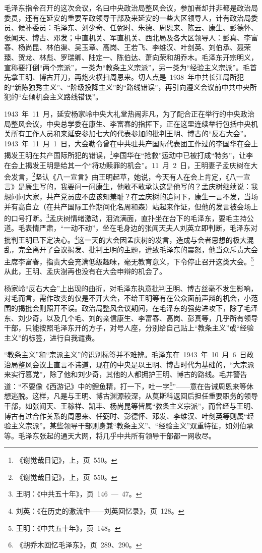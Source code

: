 毛泽东指令召开的这次会议，名曰中央政治局整风会议，参加者却并非都是政治局委员，还有在延安的重要军政领导干部及来延安的一些大区领导人，计有政治局委员、候补委员：毛泽东、刘少奇、任弼时、朱德、周恩来、陈云、康生、彭德怀、张闻天、博古、邓发；中直机关、军直机关、西北局及各大区领导人：彭真、李富春、杨尚昆、林伯渠、吴玉章、高岗、王若飞、李维汉、叶剑英、刘伯承、聂荣臻、贺龙、林彪、罗瑞卿、陆定一、陈伯达、萧向荣和胡乔木。毛泽东开宗明义，宣称要打倒“两个宗派”，一类为“教条主义宗派”，另一类为“经验主义宗派”。毛首先拿王明、博古开刀，再炮火横扫周恩来。切人点是~1938~年中共长江局所犯的“新陈独秀主义”、“阶级投降主义”的“路线错误”，再引向遵义会议前中共中央所犯的“左倾机会主义路线错误”。

1943~年~11~月，延安杨家岭中央大礼堂热闹非凡，为了配合正在举行的中央政治局整风会议，中央总学委在康生、李富春的指挥下，正在这里连续举行包括中央机关所有工作人员和来延安参加七大的代表参加的批判王明、博古的“反右大会”。1943~年~11~月~1~日，大会勒令曾在中共驻共产国际代表团工作过的李国华在会上揭发王明在共产国际所犯的错误，\footnote{《谢觉哉日记》，上，页~550。}李国华在“抢救”运动中已被打成“特务”，让李在会上揭发王明是给其一个“将功赎罪的机会”。11~月~2~日，王明妻子孟庆树在大会发言，\footnote{《谢觉哉日记》，上，页~550。}坚认《八一宣言》由王明起草，她说，今天有人在会上肯定，《八一宣言》是康生写的，我要问一问康生，他敢不敢承认这是他写的？孟庆树继续说：我想问问大家，共产党员应不应该知羞耻？在孟庆树的追问下，康生一言不发，当场并有高自立（在共产国际工作期间化名周和森）站起来作证，但他的发言被会场上的口号打断。\footnote{王明：《中共五十年》，页~146~—~47。}孟庆树情绪激动，泪流满面，直扑坐在台下的毛泽东，要毛主持公道。毛表情严肃，“一动不动”，坐在毛身边的张闻天夫人刘英立即判断，毛泽东对批判王明已下定决心。\footnote{刘英：《在历史的激流中——刘英回忆录》，页~128。}这一天的大会因孟庆树的发言，造成与会者思想的极大混乱，完全离开了会议揭发、批判王明的主题，遭致毛泽东的震怒，他当众斥责大会主席李富春，指责大会充满低级趣味，毫无教育意义，下令停止召开这类大会。\footnote{王明：《中共五十年》，页~148。}从此，王明、孟庆澍再也没有在大会申辩的机会了。

杨家岭“反右大会”上出现的曲折，对毛泽东执意批判王明、博古丝毫不发生影响，对毛而言，需作改变的仅是不开大会，不给王明等有在公众面前声辩的机会，小范围的揭批会则照开不误。政治局整风会议期间，在毛泽东的强势进攻下，除了毛泽东、刘少奇，以及几个毛、刘的亲信康生、李富春、高岗、彭真等，几乎所有领导干部，只能按照毛泽东开的方子，对号人座，分别给自己贴上“教条主义”或“经验主义”的标签，进行自我谴责。

“教条主义”和“宗派主义”的识别标签并不难辨。毛泽东在~1943~年~10~月~6~日政治局整风会议上直言不讳道，现在的中央是以王明、博古时代为基础的，“大宗派来实行篡党”，除了他和刘少奇，其他的人都拥护王明、博古的路线。毛并警告道：“不要像《西游记》中的鲤鱼精，打一下，吐一字\footnote{《胡乔木回忆毛泽东》，页~289、290。}”——意在告诫周恩来等休想逃脱。这样，凡是与王明、博古渊源较深，从莫斯科返回后担任重要职务的领导干部，如张闻天、王稼祥、凯丰、杨尚昆等皆属“教条主义宗派”，而曾经与王明、博古有过合作关系的周恩来、任弼时、彭德怀、邓发、李维汉、叶剑英等则属“经验主义宗派”。某些领导干部则身兼“教条主义”、“经验主义”双重特征，如刘伯承等。毛泽东张起的通天大网，将几乎中共所有领导干部都一网收尽。

